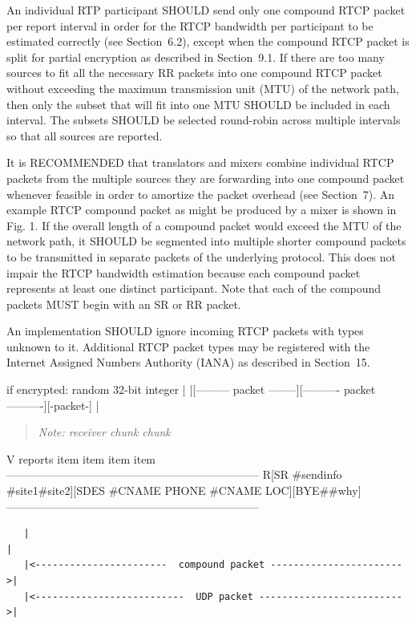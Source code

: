 \documentclass{article}
\begin{document}
\begin{itemize}
An individual RTP participant SHOULD send only one compound RTCP packet per report interval in order for the RTCP bandwidth per participant to be estimated correctly (see Section~6.2), except when the compound RTCP packet is split for partial encryption as described in Section~9.1.  If there are too many sources to fit all the necessary RR packets into one compound RTCP packet without exceeding the maximum transmission unit (MTU) of the network path, then only the subset that will fit into one MTU SHOULD be included in each interval.  The subsets SHOULD be selected round-robin across multiple intervals so that all sources are reported.

It is RECOMMENDED that translators and mixers combine individual RTCP packets from the multiple sources they are forwarding into one compound packet whenever feasible in order to amortize the packet overhead (see Section~7).  An example RTCP compound packet as might be produced by a mixer is shown in Fig. 1.  If the overall length of a compound packet would exceed the MTU of the network path, it SHOULD be segmented into multiple shorter compound packets to be transmitted in separate packets of the underlying protocol.  This does not impair the RTCP bandwidth estimation because each compound packet represents at least one distinct participant.  Note that each of the compound packets MUST begin with an SR or RR packet.

An implementation SHOULD ignore incoming RTCP packets with types unknown to it.  Additional RTCP packet types may be registered with the Internet Assigned Numbers Authority (IANA) as described in Section~15.

if encrypted: random 32-bit integer | |[--------- packet --------][---------- packet ----------][-packet-] |

\end{itemize}
\begin{quote}
\textit{Note: receiver            chunk        chunk}
\end{quote}

V                reports           item  item   item  item -------------------------------------------------------------------- R[SR \#sendinfo \#site1\#site2][SDES \#CNAME PHONE \#CNAME LOC][BYE\#\#why] --------------------------------------------------------------------

\begin{verbatim}
   |                                                                  |
   |<-----------------------  compound packet ----------------------->|
   |<--------------------------  UDP packet ------------------------->|
\end{verbatim}
\end{document}
